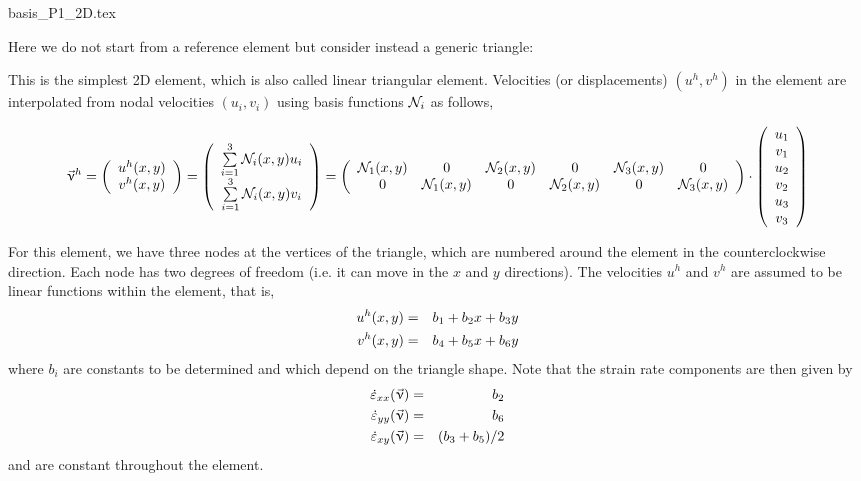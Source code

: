 \begin{flushright} {\tiny {\color{gray} basis\_P1\_2D.tex}} \end{flushright}

Here we do not start from a reference element but consider instead a generic triangle:



This is the simplest 2D element, which is also called linear triangular element.
Velocities (or displacements) $(u^h,v^h)$ in the element are interpolated from nodal velocities
$(u_i,v_i)$ using basis functions ${\mathcal{N}}_i$ as follows,
\begin{small}
\[
\vec\upnu^h=
\left(
\begin{array}{c}
u^h(x,y) \\v^h(x,y)
\end{array}
\right)
=
\left(
\begin{array}{c}
\sum\limits_{i=1}^3 {\mathcal{N}}_i(x,y) u_i \\
\sum\limits_{i=1}^3 {\mathcal{N}}_i(x,y) v_i
\end{array}
\right)
=
\left(
\begin{array}{cccccc}
{\mathcal{N}}_1(x,y) & 0 & {\mathcal{N}}_2(x,y) & 0 & {\mathcal{N}}_3(x,y) & 0\\
0 & {\mathcal{N}}_1(x,y) & 0 & {\mathcal{N}}_2(x,y) & 0 & {\mathcal{N}}_3(x,y)\\
\end{array}
\right)
\cdot
\left(
\begin{array}{c}
u_1 \\ v_1 \\ u_2 \\ v_2 \\ u_3 \\ v_3
\end{array}
\right)
\]
\end{small}

For this element, we have three nodes at the vertices of the triangle, which are 
numbered around the element in the counterclockwise direction. 
Each node has two degrees of freedom (i.e. it can move in the $x$ and $y$ directions). 
The velocities $u^h$ and $v^h$ are assumed to be linear functions within the element, that is, 
\begin{eqnarray}
u^h(x,y)&=&b_1 +b_2x+b_3y \nonumber\\
v^h(x,y)&=&b_4 +b_5x+b_6y
\end{eqnarray}
where $b_i$ are constants to be determined and which depend on the triangle shape.
Note that the strain rate components are then given by
\begin{eqnarray}
\dot\varepsilon_{xx}(\vec\upnu)&=&b_2  \nonumber\\
\dot\varepsilon_{yy}(\vec\upnu)&=&b_6  \nonumber\\
\dot\varepsilon_{xy}(\vec\upnu)&=&(b_3+b_5)/2 \nonumber
\end{eqnarray}
and are constant throughout the element.

